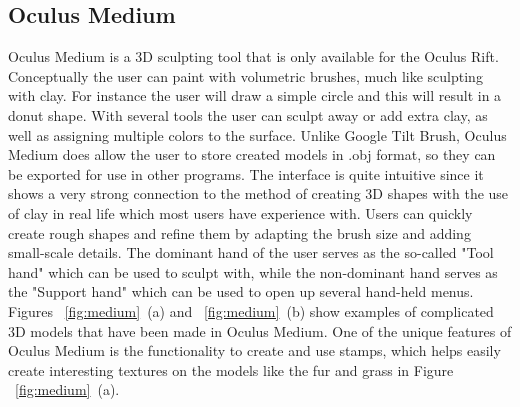 \subsection{Oculus Medium}
Oculus Medium is a 3D sculpting tool that is only available for the Oculus Rift. Conceptually the user can paint with volumetric brushes, much like sculpting with clay. For instance the user will draw a simple circle and this will result in a donut shape. With several tools the user can sculpt away or add extra clay, as well as assigning multiple colors to the surface.
Unlike Google Tilt Brush, Oculus Medium does allow the user to store created models in .obj format, so they can be exported for use in other programs. The interface is quite intuitive since it shows a very strong connection to the method of creating 3D shapes with the use of clay in real life which most users have experience with. Users can quickly create rough shapes and refine them by adapting the brush size and adding small-scale details. The dominant hand of the user serves as the so-called "Tool hand" which can be used to sculpt with, while the non-dominant hand serves as the "Support hand" which can be used to open up several hand-held menus. Figures ~\ref{fig:medium}~(a) and ~\ref{fig:medium}~(b) show examples of complicated 3D models that have been made in Oculus Medium. One of the unique features of Oculus Medium is the functionality to create and use stamps, which helps easily create interesting textures on the models like the fur and grass in Figure ~\ref{fig:medium}~(a).


